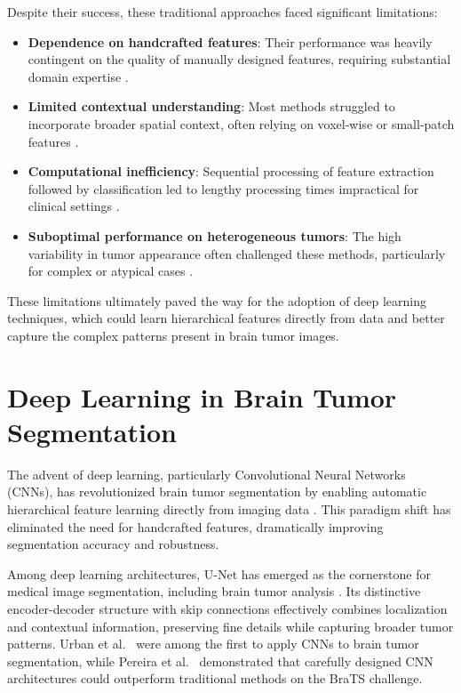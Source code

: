 Despite their success, these traditional approaches faced significant limitations:

\begin{itemize}
  \item \textbf{Dependence on handcrafted features}: Their performance was heavily contingent on the quality of manually designed features, requiring substantial domain expertise \cite{Pandit2019}.
  \item \textbf{Limited contextual understanding}: Most methods struggled to incorporate broader spatial context, often relying on voxel-wise or small-patch features \cite{Havaei2017}.
  \item \textbf{Computational inefficiency}: Sequential processing of feature extraction followed by classification led to lengthy processing times impractical for clinical settings \cite{Sompong2017}.
  \item \textbf{Suboptimal performance on heterogeneous tumors}: The high variability in tumor appearance often challenged these methods, particularly for complex or atypical cases \cite{Menze2015}.
\end{itemize}

These limitations ultimately paved the way for the adoption of deep learning techniques, which could learn hierarchical features directly from data and better capture the complex patterns present in brain tumor images.

\section{Deep Learning in Brain Tumor Segmentation}

The advent of deep learning, particularly Convolutional Neural Networks (CNNs), has revolutionized brain tumor segmentation by enabling automatic hierarchical feature learning directly from imaging data \cite{Havaei2017}. This paradigm shift has eliminated the need for handcrafted features, dramatically improving segmentation accuracy and robustness.

Among deep learning architectures, U-Net has emerged as the cornerstone for medical image segmentation, including brain tumor analysis \cite{Ronneberger2015}. Its distinctive encoder-decoder structure with skip connections effectively combines localization and contextual information, preserving fine details while capturing broader tumor patterns. Urban et al.\ \cite{Urban2014} were among the first to apply CNNs to brain tumor segmentation, while Pereira et al.\ \cite{Pereira2016} demonstrated that carefully designed CNN architectures could outperform traditional methods on the BraTS challenge.

